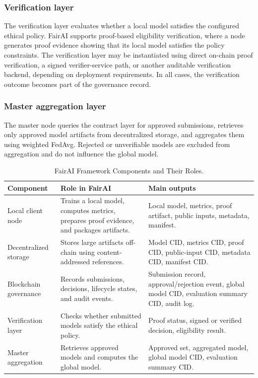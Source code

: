 \documentclass[futureinternet,article,submit,pdftex,moreauthors]{Definitions/mdpi}
\begin{document}
\subsubsection{Verification layer}

The verification layer evaluates whether a local model satisfies the configured ethical policy. FairAI supports proof-based eligibility verification, where a node generates proof evidence showing that its local model satisfies the policy constraints. The verification layer may be instantiated using direct on-chain proof verification, a signed verifier-service path, or another auditable verification backend, depending on deployment requirements. In all cases, the verification outcome becomes part of the governance record.

\subsubsection{Master aggregation layer}

The master node queries the contract layer for approved submissions, retrieves only approved model artifacts from decentralized storage, and aggregates them using weighted FedAvg. Rejected or unverifiable models are excluded from aggregation and do not influence the global model.

\begin{table}[htpb]
	\caption{FairAI Framework Components and Their Roles.}
	\label{tab:fairai-framework-components}
	\centering
	\scriptsize
	\renewcommand{\arraystretch}{1.10}
	\begin{tabular}{p{2.5cm}p{5.5cm}p{5.5cm}}
		\toprule
		\textbf{Component} & \textbf{Role in FairAI} & \textbf{Main outputs} \\
		\midrule
		Local client node & Trains a local model, computes metrics, prepares proof evidence, and packages artifacts. & Local model, metrics, proof artifact, public inputs, metadata, manifest. \\
		Decentralized storage & Stores large artifacts off-chain using content-addressed references. & Model CID, metrics CID, proof CID, public-input CID, metadata CID, manifest CID. \\
		Blockchain governance & Records submissions, decisions, lifecycle states, and audit events. & Submission record, approval/rejection event, global model CID, evaluation summary CID, audit log. \\
		Verification layer & Checks whether submitted models satisfy the ethical policy. & Proof status, signed or verified decision, eligibility result. \\
		Master aggregation & Retrieves approved models and computes the global model. & Approved set, aggregated model, global model CID, evaluation summary CID. \\
		\bottomrule
	\end{tabular}
\end{table}
\end{document}
